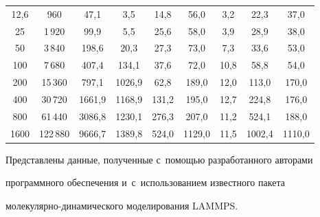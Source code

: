 {\begin{table}
\begin{center}
\begin{tabular}{|c|c|c|c|c|c|c|c|c|}
\hline

\hphantom{00}12,6&\hphantom{1\,00}960&\hphantom{00}47,1&\hphantom{000}3,5&\hphantom{0}14,8&\hphantom{0}56,0&\hphantom{0}3,2&\hphantom{0}22,3&\hphantom{0}37,0\\

\hphantom{00}25\hphantom{.0}&\hphantom{00}1\,920&\hphantom{00}99,9&\hphantom{000}5,5&\hphantom{0}25,6&\hphantom{0}58,0&\hphantom{0}3,9&\hphantom{0}28,9&\hphantom{0}38,0\\

\hphantom{00}50\hphantom{.0}&\hphantom{00}3\,840&\hphantom{0}198,6&\hphantom{00}20,3&\hphantom{0}27,3&\hphantom{0}73,0&\hphantom{0}7,3&\hphantom{0}33,6&\hphantom{0}53,0\\

\hphantom{0}100\hphantom{.0}&\hphantom{00}7\,680&\hphantom{0}407,4&\hphantom{0}134,1&\hphantom{0}37,6&\hphantom{0}72,0&10,8&\hphantom{0}58,8&\hphantom{0}54,0\\

\hphantom{0}200\hphantom{.0}&\hphantom{0}15\,360&\hphantom{0}797,1&1026,9&\hphantom{0}62,8&189,0&12,0&113,0&170,0\\

\hphantom{0}400\hphantom{.0}&\hphantom{0}30\,720&1661,9&1168,9&131,2&195,0&12,7&224,8&176,0\\

\hphantom{0}800\hphantom{.0}&\hphantom{0}61\,440&3086,8&1230,1&276,3&207,0&11,2&524,1&188,0\\

1600\hphantom{.0}&122\,880&9666,7&1389,8&524,0&1129,0\hphantom{0}&11,5&

1002,4\hphantom{0}&1110,0\hphantom{0}\\

  \hline

  \end{tabular}

  \end{center}

  \end{table}







  

  Представлены данные, полученные с~помощью разработанного авторами 

программного обеспечения и~с~использованием известного пакета  

мо\-ле\-ку\-ляр\-но-ди\-на\-ми\-че\-ско\-го моделирования LAMMPS.

}
